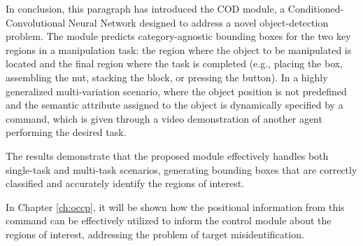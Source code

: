 In conclusion, this paragraph has introduced the COD module, a Conditioned-Convolutional Neural Network designed to address a novel object-detection problem. The module predicts category-agnostic bounding boxes for the two key regions in a manipulation task: the region where the object to be manipulated is located and the final region where the task is completed (e.g., placing the box, assembling the nut, stacking the block, or pressing the button). In a highly generalized multi-variation scenario, where the object position is not predefined and the semantic attribute assigned to the object is dynamically specified by a command, which is given through a video demonstration of another agent performing the desired task.


The results demonstrate that the proposed module effectively handles both single-task and multi-task scenarios, generating bounding boxes that are correctly classified and accurately identify the regions of interest.

In Chapter \ref{ch:occp}, it will be shown how the positional information from this command can be effectively utilized to inform the control module about the regions of interest, addressing the problem of target misidentification.
